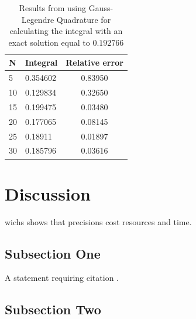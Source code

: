 \documentclass[twoside,twocolumn]{article}
\begin{document}
\par
\begin{table}[h]

\begin{center}
\begin{threeparttable}
\begin{tabular}{|l|l|c|}
\hline
N  & Integral & \multicolumn{1}{l|}{Relative error} \\ \hline
5  & 0.354602 & 0.83950         \\ \hline
10 & 0.129834 & 0.32650         \\ \hline
15 & 0.199475 & 0.03480         \\ \hline
20 & 0.177065 & 0.08145        \\ \hline
25 & 0.18911  & 0.01897        \\ \hline
30 & 0.185796 & 0.03616        \\ \hline
\end{tabular}
\end{threeparttable}
\end{center}
\label{table:tableLegendre}
\caption{Results from using Gauss-Legendre Quadrature for calculating the integral with an exact solution equal to $0.192766$}
\end{table}



\section{Discussion}
wichs shows that precisions cost resources and time.
\subsection{Subsection One}

A statement requiring citation \cite{Figueredo:2009dg}.
\blindtext %

\subsection{Subsection Two}

\blindtext %

\end{document}
